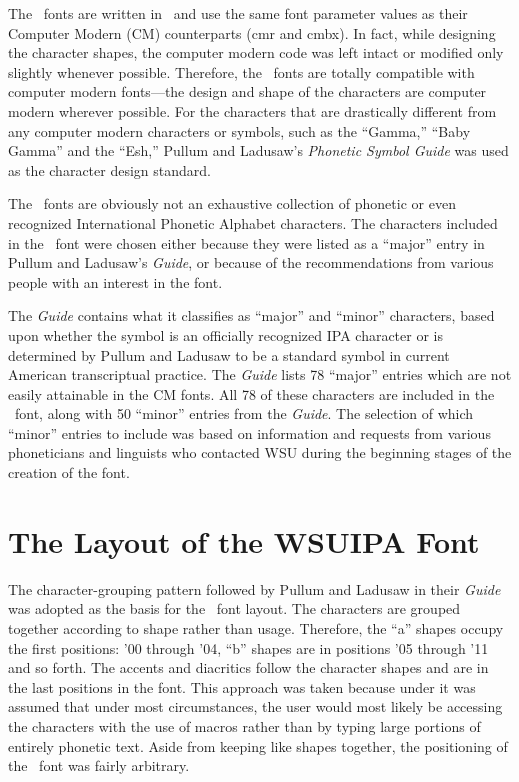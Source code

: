 The \wsu\  fonts are written in \meta\ and use the same font parameter values
as their Computer Modern (CM) counterparts (cmr and cmbx). In fact, while
designing the character shapes, the computer modern code was left intact or
modified only slightly whenever possible. Therefore, the \wsu\  fonts
are totally compatible with computer modern fonts---the design and shape
of the characters are computer modern wherever possible. For the characters
that are drastically different from any computer modern characters or symbols,
such as the ``Gamma,'' ``Baby Gamma'' and the ``Esh,'' Pullum and Ladusaw's
{\it Phonetic Symbol Guide} was used as the character design
standard.

The \wsu\  fonts are obviously not an exhaustive collection of phonetic or
even recognized International Phonetic Alphabet characters. The characters
included in the \wsu\  font were chosen either because they were listed
as a ``major'' entry in Pullum and Ladusaw's {\it Guide\/},
or because of the recommendations from
various people with an interest in the font.

The {\it Guide} contains what it classifies as ``major'' and ``minor''
characters, based upon whether the symbol is an officially recognized IPA
character or is determined by Pullum and Ladusaw
to be a standard symbol in current American
transcriptual practice. The {\it Guide}
lists 78 ``major'' entries which are not easily
attainable in the CM fonts. All 78 of these characters are included in the
\wsu\  font, along with 50 ``minor'' entries from the {\it Guide}.
The selection of which
``minor'' entries to include was based on information and requests from
various phoneticians and linguists who contacted WSU during the beginning
stages of the creation of the font.

\section{The Layout of the WSUIPA Font}

The character-grouping pattern followed by Pullum and Ladusaw in their
{\it Guide} was adopted as the basis
for the \wsu\ font layout. The characters
are grouped together according to shape rather than usage. Therefore,
the ``a'' shapes occupy
the first positions: '00 through '04, ``b'' shapes are in positions '05
through '11 and so forth. The accents and diacritics follow the character
shapes and are in the last positions in the font. This approach was taken
because under it was assumed that under most circumstances,
the user would most likely be accessing the characters with the use of macros
rather than by typing large portions of entirely phonetic text.
Aside from keeping like shapes together, the positioning of the
\wsu\  font was fairly arbitrary.

